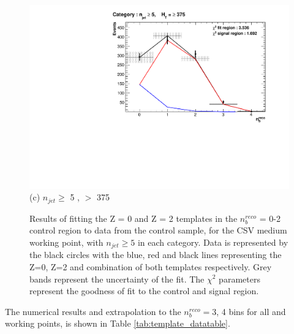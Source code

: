 \begin{figure}[ht]
\footnotesize
\centering
\begin{minipage}[b]{0.51\linewidth}
\centering
\includegraphics[width = 1.0\linewidth]{plots/ThesisPlots/Final_Fit_To_Data_Normal_Medium_HTBin_OneMuon_Template_375_jet_mult_5.pdf}
\centering (c) $n_{jet} \geq$ 5 , \theht $>$ 375 
\end{minipage}
\caption[Results of fitting the Z = 0 and Z = 2 templates in the $n_{b}^{reco}$ = 0-2 control region to data from the \mupjets control sample, for the \ac{CSV} medium working point, with $n_{jet} \geq 5$ in each \theht category.]{Results of fitting the Z = 0 and Z = 2 templates in the $n_{b}^{reco}$ = 0-2 control region to data from the \mupjets control sample, for the \ac{CSV} medium working point, with $n_{jet} \geq 5$ in each \theht category. Data is represented by the black circles with the blue, red and black lines representing the Z=0, Z=2 and combination of both templates respectively. Grey bands represent the uncertainty of the fit. The $\chi^{2}$ parameters represent the goodness of fit to the control and signal region.}
\label{fig:template_data_med_njet5}
\end{figure}
\FloatBarrier
The numerical results and extrapolation to the $n_{b}^{reco} =$3, 4 bins for all \theht and working points, is shown in Table \ref{tab:template_datatable}.

